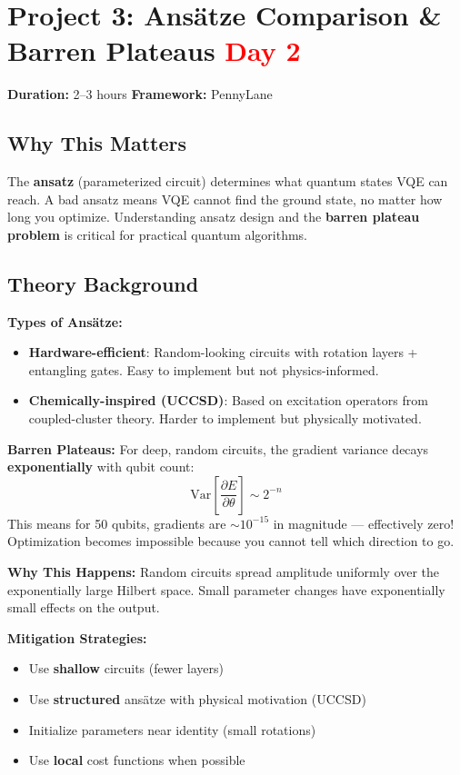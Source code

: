 \documentclass[11pt,a4paper]{article}
\begin{document}
\section{Project 3: Ansätze Comparison \& Barren Plateaus \hfill \textcolor{red}{\textbf{Day 2}}}

\begin{questionbox}
\textbf{Duration:} 2--3 hours \quad \textbf{Framework:} PennyLane
\end{questionbox}

\subsection*{Why This Matters}
The \textbf{ansatz} (parameterized circuit) determines what quantum states VQE can reach. A bad ansatz means VQE cannot find the ground state, no matter how long you optimize. Understanding ansatz design and the \textbf{barren plateau problem} is critical for practical quantum algorithms.

\subsection*{Theory Background}
\textbf{Types of Ansätze:}
\begin{itemize}
    \item \textbf{Hardware-efficient}: Random-looking circuits with rotation layers + entangling gates. Easy to implement but not physics-informed.
    \item \textbf{Chemically-inspired (UCCSD)}: Based on excitation operators from coupled-cluster theory. Harder to implement but physically motivated.
\end{itemize}

\textbf{Barren Plateaus:} For deep, random circuits, the gradient variance decays \textbf{exponentially} with qubit count:
\[
\text{Var}\left[\frac{\partial E}{\partial \theta}\right] \sim 2^{-n}
\]
This means for 50 qubits, gradients are $\sim 10^{-15}$ in magnitude --- effectively zero! Optimization becomes impossible because you cannot tell which direction to go.

\textbf{Why This Happens:} Random circuits spread amplitude uniformly over the exponentially large Hilbert space. Small parameter changes have exponentially small effects on the output.

\textbf{Mitigation Strategies:}
\begin{itemize}
    \item Use \textbf{shallow} circuits (fewer layers)
    \item Use \textbf{structured} ansätze with physical motivation (UCCSD)
    \item Initialize parameters near identity (small rotations)
    \item Use \textbf{local} cost functions when possible
\end{itemize}
\end{document}
